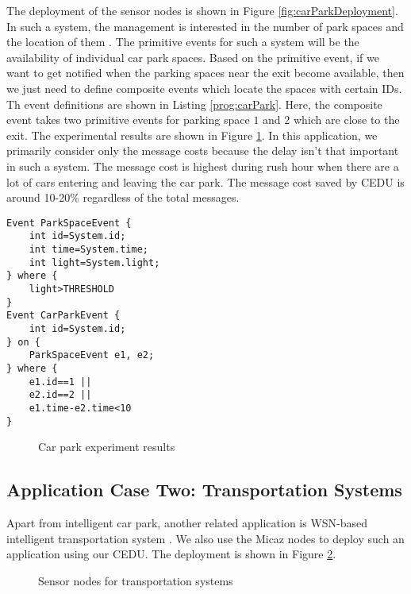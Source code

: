 The deployment of the sensor nodes is shown in Figure \ref{fig:carParkDeployment}. In such a system, the management is interested in the number of park spaces and the location of them \cite{tang:carpark}. The primitive events for such a system will be the availability of individual car park spaces. Based on the primitive event, if we want to get notified when the parking spaces near the exit become available, then we just need to define composite events which locate the spaces with certain IDs. Th event definitions are shown in Listing \ref{prog:carPark}. Here, the composite event takes two primitive events for parking space \(1\) and \(2\) which are close to the exit. The experimental results are shown in Figure \ref{fig:carParkResults}. In this application, we primarily consider only the message costs because the delay isn't that important in such a system. The message cost is highest during rush hour when there are a lot of cars entering and leaving the car park. The message cost saved by CEDU is around 10-20\% regardless of the total messages.

\begin{lstlisting}[caption=Event definition for a car park, label=prog:carPark]
Event ParkSpaceEvent {
	int id=System.id;
	int time=System.time;
	int light=System.light;
} where {
	light>THRESHOLD
}
Event CarParkEvent {
	int id=System.id;
} on {
	ParkSpaceEvent e1, e2;
} where {
	e1.id==1 ||
	e2.id==2 ||
	e1.time-e2.time<10
}
\end{lstlisting}

\begin{figure}
\centering
{}
\caption{Car park experiment results}
\label{fig:carParkResults}
\end{figure}

\subsection{Application Case Two: Transportation Systems}
Apart from intelligent car park, another related application is WSN-based intelligent transportation system \cite{lai:its}. We also use the Micaz nodes to deploy such an application using our CEDU. The deployment is shown in Figure \ref{fig:itsSensor}.

\begin{figure}
\centering
{}
\caption{Sensor nodes for transportation systems}
\label{fig:itsSensor}
\end{figure}

